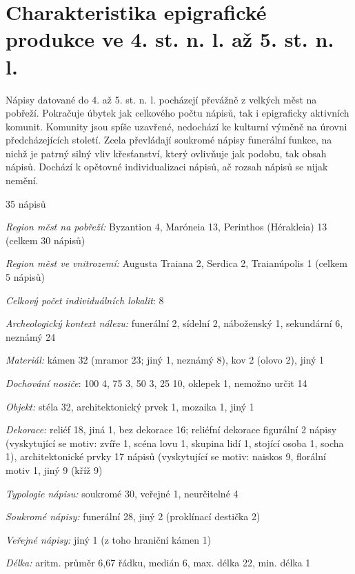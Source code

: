\section[charakteristika-epigrafické-produkce-ve-4.-st.-n.-l.-až-5.-st.-n.-l.]{Charakteristika epigrafické produkce ve 4. st. n. l. až 5. st. n. l.}

Nápisy datované do 4. až 5. st. n. l. pocházejí převážně z velkých měst na pobřeží. Pokračuje úbytek jak celkového počtu nápisů, tak i epigraficky aktivních komunit. Komunity jsou spíše uzavřené, nedochází ke kulturní výměně na úrovni předcházejících století. Zcela převládají soukromé nápisy funerální funkce, na nichž je patrný silný vliv křesťanství, který ovlivňuje jak podobu, tak obsah nápisů. Dochází k opětovné individualizaci nápisů, ač rozsah nápisů se nijak nemění.

\placetable[none]{}
\starttable[|l|]
\HL
{} 35 nápisů

{\em Region měst na pobřeží:} Byzantion 4, Maróneia 13, Perinthos (Hérakleia) 13 (celkem 30 nápisů)

{\em Region měst ve vnitrozemí:} Augusta Traiana 2, Serdica 2, Traianúpolis 1 (celkem 5 nápisů)

{\em Celkový počet individuálních lokalit}: 8

{\em Archeologický kontext nálezu:} funerální 2, sídelní 2, náboženský 1, sekundární 6, neznámý 24

{\em Materiál:} kámen 32 (mramor 23; jiný 1, neznámý 8), kov 2 (olovo 2), jiný 1

{\em Dochování nosiče}: 100  4, 75  3, 50  3, 25  10, oklepek 1, nemožno určit 14

{\em Objekt:} stéla 32, architektonický prvek 1, mozaika 1, jiný 1

{\em Dekorace:} reliéf 18, jiná 1, bez dekorace 16; reliéfní dekorace figurální 2 nápisy (vyskytující se motiv: zvíře 1, scéna lovu 1, skupina lidí 1, stojící osoba 1, socha 1), architektonické prvky 17 nápisů (vyskytující se motiv: naiskos 9, florální motiv 1, jiný 9 (kříž 9)

{\em Typologie nápisu:} soukromé 30, veřejné 1, neurčitelné 4

{\em Soukromé nápisy:} funerální 28, jiný 2 (proklínací destička 2)

{\em Veřejné nápisy:} jiný 1 (z toho hraniční kámen 1)

{\em Délka:} aritm. průměr 6,67 řádku, medián 6, max. délka 22, min. délka 1


